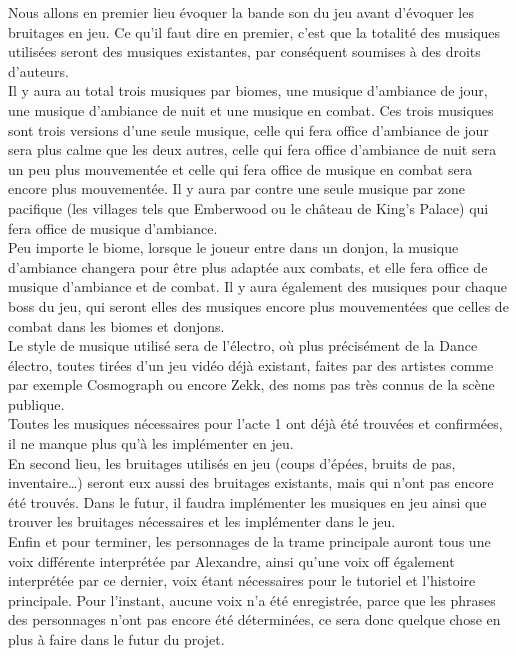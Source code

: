 
Nous allons en premier lieu évoquer la bande son du jeu avant d'évoquer les bruitages en jeu. Ce qu'il faut dire en premier, c'est que la totalité des musiques utilisées seront des musiques existantes, par conséquent soumises à des droits d'auteurs.
\\

Il y aura au total trois musiques par biomes, une musique d'ambiance de jour, une musique d'ambiance de nuit et une musique en combat. Ces trois musiques sont trois versions d'une seule musique, celle qui fera office d'ambiance de jour sera plus calme que les deux autres, celle qui fera office d'ambiance de nuit sera un peu plus mouvementée et celle qui fera office de musique en combat sera encore plus mouvementée. Il y aura par contre une seule musique par zone pacifique (les villages tels que Emberwood ou le château de King's Palace) qui fera office de musique d'ambiance.
\\

Peu importe le biome, lorsque le joueur entre dans un donjon, la musique d'ambiance changera pour être plus adaptée aux combats, et elle fera office de musique d'ambiance et de combat. Il y aura également des musiques pour chaque boss du jeu, qui seront elles des musiques encore plus mouvementées que celles de combat dans les biomes et donjons.
\\

Le style de musique utilisé sera de l'électro, où plus précisément de la Dance électro, toutes tirées d'un jeu vidéo déjà existant, faites par des artistes comme par exemple Cosmograph ou encore Zekk, des noms pas très connus de la scène publique.
\\

Toutes les musiques nécessaires pour l'acte 1 ont déjà été trouvées et confirmées, il ne manque plus qu'à les implémenter en jeu.
\\

En second lieu, les bruitages utilisés en jeu (coups d'épées, bruits de pas, inventaire…) seront eux aussi des bruitages existants, mais qui n'ont pas encore été trouvés. Dans le futur, il faudra implémenter les musiques en jeu ainsi que trouver les bruitages nécessaires et les implémenter dans le jeu.
\\

Enfin et pour terminer, les personnages de la trame principale auront tous une voix différente interprétée par Alexandre, ainsi qu'une voix off également interprétée par ce dernier, voix étant nécessaires pour le tutoriel et l'histoire principale. Pour l'instant, aucune voix n'a été enregistrée, parce que les phrases des personnages n'ont pas encore été déterminées, ce sera donc quelque chose en plus à faire dans le futur du projet.
\\
